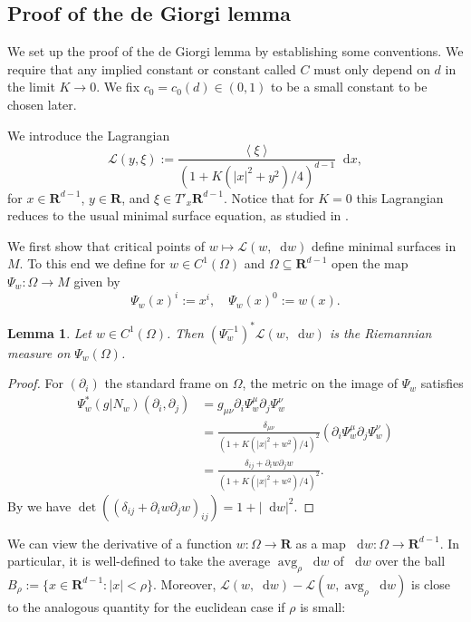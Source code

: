 \documentclass[reqno,10pt]{amsart}
\newcommand{\RR}{\mathbf{R}}
\DeclareMathOperator{\avg}{avg}
\newcommand*\dif{\mathop{}\!\mathrm{d}}
\newcommand{\Lagrange}{\mathscr L}
\def\Japan#1{\left \langle #1 \right \rangle}
\newtheorem{lemma}[theorem]{Lemma}
\theoremstyle{definition}
\numberwithin{equation}{section}
\begin{document}
\subsection{Proof of the de Giorgi lemma}
We set up the proof of the de Giorgi lemma by establishing some conventions.
We require that any implied constant or constant called $C$ must only depend on $d$ in the limit $K \to 0$.
We fix $c_0 = c_0(d) \in (0, 1)$ to be a small constant to be chosen later.

We introduce the Lagrangian
$$\Lagrange(y, \xi) := \frac{\Japan{\xi}}{(1 + K(|x|^2 + y^2)/4)^{d - 1}} \dif x,$$
for $x \in \RR^{d - 1}$, $y \in \RR$, and $\xi \in T'_x \RR^{d - 1}$.
Notice that for $K = 0$ this Lagrangian reduces to the usual minimal surface equation, as studied in \cite[\S6]{Giusti77}.

We first show that critical points of $w \mapsto \Lagrange(w, \dif w)$ define minimal surfaces in $M$.
To this end we define for $w \in C^1(\Omega)$ and $\Omega \subseteq \RR^{d - 1}$ open the map $\Psi_w: \Omega \to M$ given by 
$$\Psi_w(x)^i := x^i, \quad \Psi_w(x)^0 := w(x).$$

\begin{lemma}\label{Plateau setup lemma}
Let $w \in C^1(\Omega)$. Then $(\Psi_w^{-1})^* \Lagrange(w, \dif w)$ is the Riemannian measure on $\Psi_w(\Omega)$.
\end{lemma}
\begin{proof}
For $(\partial_i)$ the standard frame on $\Omega$, the metric on the image of $\Psi_w$ satisfies
\begin{align*}
\Psi_w^*(g|N_w)(\partial_i, \partial_j) &= g_{\mu\nu} \partial_i \Psi_w^\mu \partial_j \Psi_w^\nu \\
&= \frac{\delta_{\mu\nu}}{(1 + K(|x|^2 + w^2)/4)^2} (\partial_i \Psi_w^\mu \partial_j \Psi_w^\nu) \\
&= \frac{\delta_{ij} + \partial_i w \partial_j w}{(1 + K(|x|^2 + w^2)/4)^2}.
\end{align*}
By \cite[(24)]{Petersen2008} we have $\det((\delta_{ij} + \partial_i w \partial_j w)_{ij}) = 1 + |\dif w|^2$.
\end{proof}

We can view the derivative of a function $w: \Omega \to \RR$ as a map $\dif w: \Omega \to \RR^{d - 1}$.
In particular, it is well-defined to take the average $\avg_\rho \dif w$ of $\dif w$ over the ball $B_\rho := \{x \in \RR^{d - 1}: |x| < \rho\}$.
Moreover, $\Lagrange(w, \dif w) - \Lagrange(w, \avg_\rho \dif w)$ is close to the analogous quantity for the euclidean case if $\rho$ is small:
\end{document}
